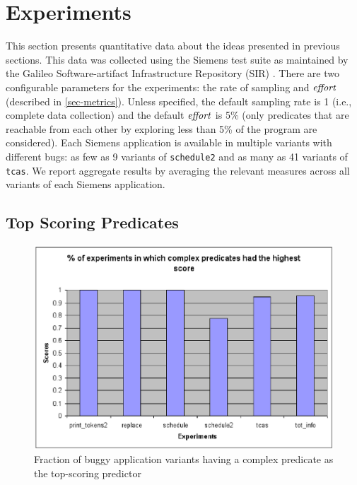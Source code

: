 
\section{Experiments}

This section presents quantitative data about the ideas presented in previous sections.  This data was collected using the Siemens test suite \cite{257766} as maintained by the Galileo Software-artifact Infrastructure Repository (SIR) \cite{Do05,SAI}.  There are two configurable parameters for the experiments: the rate of sampling and $\mathit{effort}$ (described in \autoref{sec-metrics}).  Unless specified, the default sampling rate is 1 (i.e., complete data collection) and the default $\mathit{effort}$ is 5\% (only predicates that are reachable from each other by exploring less than 5\% of the program are considered).  Each Siemens application is available in multiple variants with different bugs: as few as 9 variants of \texttt{schedule2} and as many as 41 variants of \texttt{tcas}.  We report aggregate results by averaging the relevant measures across all variants of each Siemens application.

\subsection{Top Scoring Predicates}

\label{sec-quant}
\begin{figure}
  \centering
  \includegraphics{charts/top-pred}
  \caption{Fraction of buggy application variants having a complex predicate as the top-scoring predictor}
  \label{fig-top-pred}
\end{figure}

